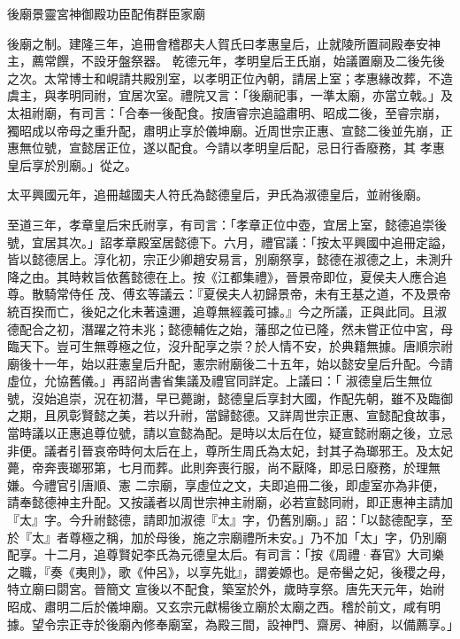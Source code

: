 
\begin{pinyinscope}

 後廟景靈宮神御殿功臣配侑群臣家廟



 後廟之制。建隆三年，追冊會稽郡夫人賀氏曰孝惠皇后，止就陵所置祠殿奉安神主，薦常饌，不設牙盤祭器。
 乾德元年，孝明皇后王氏崩，始議置廟及二後先後之次。太常博士和峴請共殿別室，以孝明正位內朝，請居上室；孝惠緣改葬，不造虞主，與孝明同祔，宜居次室。禮院又言：「後廟祀事，一準太廟，亦當立戟。」及太祖祔廟，有司言：「合奉一後配食。按唐睿宗追謚肅明、昭成二後，至睿宗崩，獨昭成以帝母之重升配，肅明止享於儀坤廟。近周世宗正惠、宣懿二後並先崩，正惠無位號，宣懿居正位，遂以配食。今請以孝明皇后配，忌日行香廢務，其
 孝惠皇后享於別廟。」從之。



 太平興國元年，追冊越國夫人符氏為懿德皇后，尹氏為淑德皇后，並祔後廟。



 至道三年，孝章皇后宋氏祔享，有司言：「孝章正位中壺，宜居上室，懿德追崇後號，宜居其次。」詔孝章殿室居懿德下。六月，禮官議：「按太平興國中追冊定謚，皆以懿德居上。淳化初，宗正少卿趙安易言，別廟祭享，懿德在淑德之上，未測升降之由。其時敕旨依舊懿德在上。按《江都集禮》，晉景帝即位，夏侯夫人應合追尊。散騎常侍任
 茂、傅玄等議云：『夏侯夫人初歸景帝，未有王基之道，不及景帝統百揆而亡，後妃之化未著遠邇，追尊無經義可據。』今之所議，正與此同。且淑德配合之初，潛躍之符未兆；懿德輔佐之始，藩邸之位已隆，然未嘗正位中宮，母臨天下。豈可生無尊極之位，沒升配享之崇？於人情不安，於典籍無據。唐順宗祔廟後十一年，始以莊憲皇后升配，憲宗祔廟後二十五年，始以懿安皇后升配。今請虛位，允協舊儀。」再詔尚書省集議及禮官同詳定。上議曰：「
 淑德皇后生無位號，沒始追崇，況在初潛，早已薨謝，懿德皇后享封大國，作配先朝，雖不及臨御之期，且夙彰賢懿之美，若以升祔，當歸懿德。又詳周世宗正惠、宣懿配食故事，當時議以正惠追尊位號，請以宣懿為配。是時以太后在位，疑宣懿祔廟之後，立忌非便。議者引晉哀帝時何太后在上，尊所生周氏為太妃，封其子為瑯邪王。及太妃薨，帝奔喪瑯邪第，七月而葬。此則奔喪行服，尚不厭降，即忌日廢務，於理無嫌。今禮官引唐順、憲
 二宗廟，享虛位之文，夫即追冊二後，即虛室亦為非便，請奉懿德神主升配。又按議者以周世宗神主祔廟，必若宣懿同祔，即正惠神主請加『太』字。今升祔懿德，請即加淑德『太』字，仍舊別廟。」詔：「以懿德配享，至於『太』者尊極之稱，加於母後，施之宗廟禮所未安。」乃不加「太」字，仍別廟配享。十二月，追尊賢妃李氏為元德皇太后。有司言：「按《周禮·春官》大司樂之職，『奏《夷則》，歌《仲呂》，以享先妣』，謂姜嫄也。是帝嚳之妃，後稷之母，特立廟曰閟宮。晉簡文
 宣後以不配食，築室於外，歲時享祭。唐先天元年，始祔昭成、肅明二后於儀坤廟。又玄宗元獻楊後立廟於太廟之西。稽於前文，咸有明據。望令宗正寺於後廟內修奉廟室，為殿三間，設神門、齋房、神廚，以備薦享。」




\end{pinyinscope}
